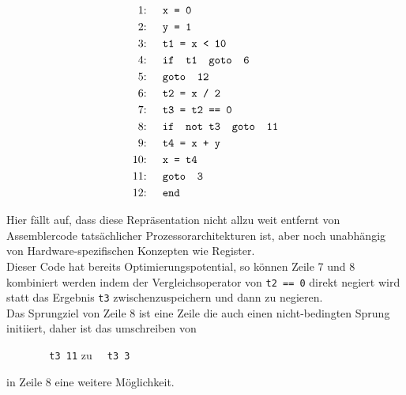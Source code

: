 \begin{figure}[H]
  \begin{align*}
    \text{1: }\quad &\texttt{x = 0}\\
    \text{2: }\quad &\texttt{y = 1}\\
    \text{3: }\quad &\texttt{t1 = x < 10}\\
    \text{4: }\quad &\texttt{\text{if } t1 \text{ goto } 6}\\
    \text{5: }\quad &\texttt{\text{goto } 12}\\
    \text{6: }\quad &\texttt{t2 = x\ /\ 2}\\
    \text{7: }\quad &\texttt{t3 = t2 == 0}\\
    \text{8: }\quad &\texttt{\text{if } \text{not}\ t3 \text{ goto } 11}\\
    \text{9: }\quad &\texttt{t4 = x + y}\\
    \text{10: }\quad &\texttt{x = t4}\\
    \text{11: }\quad &\texttt{\text{goto } 3}\\
    \text{12: }\quad &\texttt{\text{end}}
  \end{align*}
\end{figure}

Hier fällt auf, dass diese Repräsentation nicht allzu weit entfernt von Assemblercode tatsächlicher Prozessorarchitekturen ist, aber noch unabhängig von Hardware-spezifischen Konzepten wie Register.\\
Dieser Code hat bereits Optimierungspotential, so können Zeile 7 und 8 kombiniert werden indem der Vergleichsoperator von \texttt{t2 == 0} direkt negiert wird statt das Ergebnis \texttt{t3} zwischenzuspeichern und dann zu negieren.\\
Das Sprungziel von Zeile 8 ist eine Zeile die auch einen nicht-bedingten Sprung initiiert, daher ist das umschreiben von
\begin{figure}[H]
  \centering
  \texttt{ \ t3  11}
\qquad
zu\qquad
  \texttt{ \ t3  3}
\end{figure}
in Zeile 8 eine weitere Möglichkeit.
